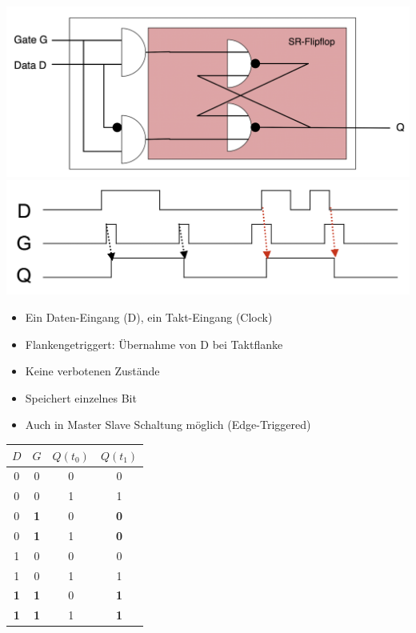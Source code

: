 \documentclass[a4paper,6pt]{article}
\begin{document}
\begin{multicols*}{3}
\begin{center}
    \includegraphics[width=1\linewidth]{resources/Bildschirmfoto 2024-01-03 um 16.50.26.png}
    \includegraphics[width=1\linewidth]{resources/Bildschirmfoto 2024-01-03 um 16.51.26.png}
\end{center}

\begin{itemize}
    \item Ein Daten-Eingang (D), ein Takt-Eingang (Clock)
    \item Flankengetriggert: Übernahme von D bei Taktflanke
    \item Keine verbotenen Zustände
    \item Speichert einzelnes Bit
    \item Auch in Master Slave Schaltung möglich (Edge-Triggered)
\end{itemize}

\begin{center}
    \begin{tabular}{|c|c||c|c|}
    \hline
    $D$ & $G$ & $Q(t_0)$ & $Q(t_1)$ \\ \hline
    0 & 0 & 0 & 0 \\ \hline
    0 & 0 & 1 & 1 \\ \hline
    0 & \textbf{1} & 0 & \textbf{0} \\ \hline
    0 & \textbf{1} & 1 & \textbf{0} \\ \hline
    1 & 0 & 0 & 0 \\ \hline
    1 & 0 & 1 & 1 \\ \hline
    \textbf{1} & \textbf{1} & 0 & \textbf{1} \\ 
    \textbf{1} & \textbf{1} & 1 & \textbf{1} \\ \hline
    \end{tabular}
\end{center}


\end{multicols*}
\end{document}
